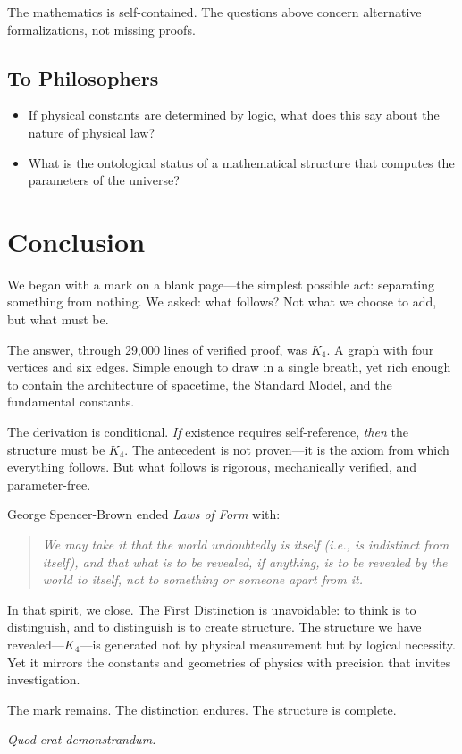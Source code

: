 \documentclass[11pt,a4paper]{book}
\begin{document}
The mathematics is self-contained.  The questions above concern alternative
formalizations, not missing proofs.

\section{To Philosophers}

\begin{itemize}
\item If physical constants are determined by logic, what does this say
  about the nature of physical law?
\item What is the ontological status of a mathematical structure that
  computes the parameters of the universe?
\end{itemize}

\chapter{Conclusion}

We began with a mark on a blank page---the simplest possible act:
separating something from nothing. We asked: what follows? Not what we
choose to add, but what must be.

The answer, through 29,000 lines of verified proof, was $K_4$.
A graph with four vertices and six edges. Simple enough to draw in a
single breath, yet rich enough to contain the architecture of
spacetime, the Standard Model, and the fundamental constants.

The derivation is conditional. \emph{If} existence requires
self-reference, \emph{then} the structure must be $K_4$. The
antecedent is not proven---it is the axiom from which everything
follows. But what follows is rigorous, mechanically verified, and
parameter-free.

\medskip

George Spencer-Brown ended \emph{Laws of Form} with:

\begin{quote}
\emph{We may take it that the world undoubtedly is itself (i.e., is
indistinct from itself), and that what is to be revealed, if anything,
is to be revealed by the world to itself, not to something or someone
apart from it.}
\end{quote}

In that spirit, we close.  The First Distinction is unavoidable: to
think is to distinguish, and to distinguish is to create structure.
The structure we have revealed---$K_4$---is generated not by physical
measurement but by logical necessity. Yet it mirrors the constants
and geometries of physics with precision that invites investigation.

The mark remains.  The distinction endures.  The structure is complete.

\textit{Quod erat demonstrandum.}
\end{document}
